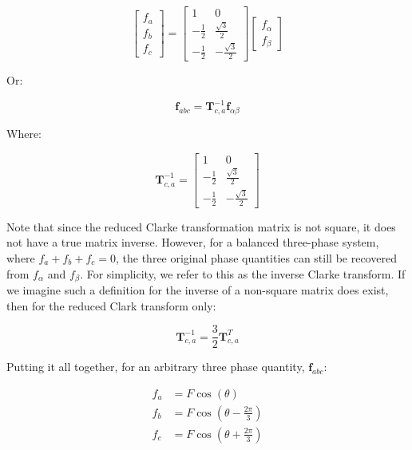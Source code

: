 \documentclass{article}
\begin{document}
\begin{equation}
    \begin{bmatrix}
        f_a \\
        f_b \\
        f_c
    \end{bmatrix}
    =
    \begin{bmatrix}
        1 & 0 \\
        -\frac{1}{2} & \frac{\sqrt{3}}{2} \\
        -\frac{1}{2} & -\frac{\sqrt{3}}{2}
    \end{bmatrix}
    \begin{bmatrix}
        f_{\alpha} \\
        f_{\beta}
    \end{bmatrix}
\end{equation}

Or:

\begin{equation}
    \mathbf{f}_{abc} = \mathbf{T}_{c,a}^{-1}\mathbf{f}_{\alpha\beta}
\end{equation}

Where:

\begin{equation}
    \mathbf{T}_{c,a}^{-1}
    =
    \begin{bmatrix}
        1 & 0 \\
        -\frac{1}{2} & \frac{\sqrt{3}}{2} \\
        -\frac{1}{2} & -\frac{\sqrt{3}}{2}
    \end{bmatrix}
\end{equation}

Note that since the reduced Clarke transformation matrix is not square, it does not have a true matrix inverse. However, for a balanced three-phase system, where $f_a+f_b+f_c=0$, the three original phase quantities can still be recovered from $f_\alpha$ and $f_\beta$. For simplicity, we refer to this as the inverse Clarke transform. If we imagine such a definition for the inverse of a non-square matrix does exist, then for the reduced Clark transform only:

\begin{equation}
    \mathbf{T}_{c,a}^{-1} = \frac{3}{2}\mathbf{T}_{c,a}^{T}
\end{equation}

Putting it all together, for an arbitrary three phase quantity, $\mathbf{f}_{abc}$:

\begin{align}
    f_a &= F\cos(\theta) \\
    f_b &= F\cos\left(\theta-\frac{2\pi}{3}\right) \\
    f_c &= F\cos\left(\theta+\frac{2\pi}{3}\right)
\end{align}
\end{document}
